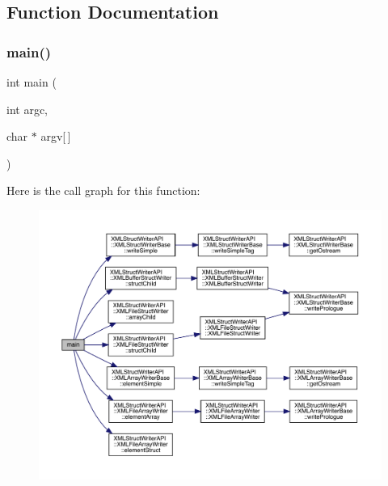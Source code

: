 \subsection{Function Documentation}
\mbox{\label{adat-devel_2other__libs_2xpath__reader_2examples_2struct__writer__test_8cc_a0ddf1224851353fc92bfbff6f499fa97}} 
\subsubsection{\texorpdfstring{main()}{main()}}
{\footnotesize\ttfamily int main (\begin{DoxyParamCaption}\item[{int}]{argc,  }\item[{char $\ast$}]{argv\mbox{[}$\,$\mbox{]} }\end{DoxyParamCaption})}

Here is the call graph for this function\+:
\nopagebreak
\begin{figure}[H]
\begin{center}
\leavevmode
\includegraphics[width=350pt]{d4/d5f/adat-devel_2other__libs_2xpath__reader_2examples_2struct__writer__test_8cc_a0ddf1224851353fc92bfbff6f499fa97_cgraph}
\end{center}
\end{figure}
